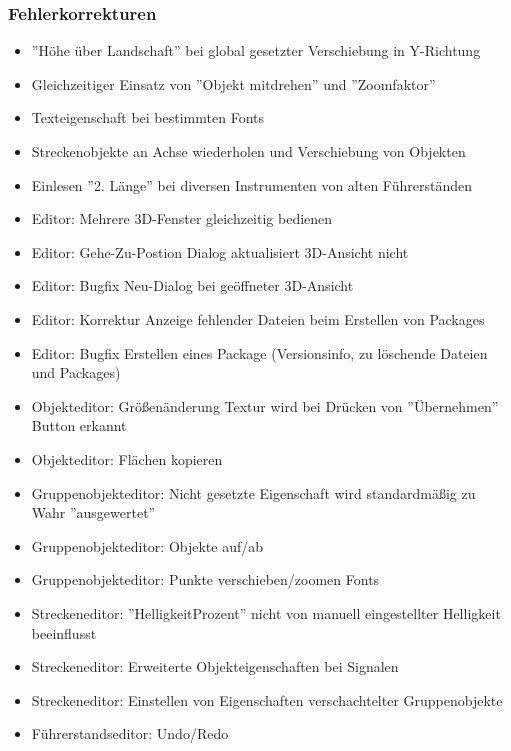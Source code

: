 \subsubsection{Fehlerkorrekturen}
\begin{itemize}
\item ''Höhe über Landschaft'' bei global gesetzter Verschiebung in Y-Richtung
\item Gleichzeitiger Einsatz von ''Objekt mitdrehen'' und ''Zoomfaktor''
\item Texteigenschaft bei bestimmten Fonts
\item Streckenobjekte an Achse wiederholen und Verschiebung von Objekten
\item Einlesen ''2. Länge'' bei diversen Instrumenten von alten Führerständen

\item Editor: Mehrere 3D-Fenster gleichzeitig bedienen
\item Editor: Gehe-Zu-Postion Dialog aktualisiert 3D-Ansicht nicht
\item Editor: Bugfix Neu-Dialog bei geöffneter 3D-Ansicht
\item Editor: Korrektur Anzeige fehlender Dateien beim Erstellen von Packages
\item Editor: Bugfix Erstellen eines Package (Versionsinfo, zu löschende Dateien und Packages)

\item Objekteditor: Größenänderung Textur wird bei Drücken von ''Übernehmen'' Button erkannt
\item Objekteditor: Flächen kopieren

\item Gruppenobjekteditor: Nicht gesetzte Eigenschaft wird standardmäßig zu Wahr ''ausgewertet''
\item Gruppenobjekteditor: Objekte auf/ab
\item Gruppenobjekteditor: Punkte verschieben/zoomen Fonts

\item Streckeneditor: ''HelligkeitProzent'' nicht von manuell eingestellter Helligkeit beeinflusst
\item Streckeneditor: Erweiterte Objekteigenschaften bei Signalen
\item Streckeneditor: Einstellen von Eigenschaften verschachtelter Gruppenobjekte

\item Führerstandseditor: Undo/Redo
\end{itemize}


